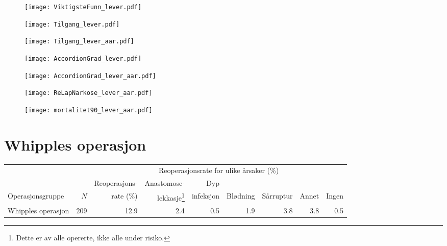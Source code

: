 \documentclass[norsk,a4paper]{article}\usepackage[]{graphicx}\usepackage[]{color}
\begin{document}
\begin{figure}[ht]
\centering
\texttt{[image: ViktigsteFunn\_lever.pdf]}
\caption{}
\end{figure}

\begin{figure}[ht]
\centering
\texttt{[image: Tilgang\_lever.pdf]}
\caption{}
\end{figure}

\begin{figure}[ht]
\centering
\texttt{[image: Tilgang\_lever\_aar.pdf]}
\caption{}
\end{figure}

\begin{figure}[ht]
\centering
\texttt{[image: AccordionGrad\_lever.pdf]}
\caption{}
\end{figure}

\begin{figure}[ht]
\centering
\texttt{[image: AccordionGrad\_lever\_aar.pdf]}
\caption{}
\end{figure}

\begin{figure}[ht]
\centering
\texttt{[image: ReLapNarkose\_lever\_aar.pdf]}
\caption{}
\end{figure}


\begin{figure}[ht]
\centering
\texttt{[image: mortalitet90\_lever\_aar.pdf]}
\caption{}
\end{figure}

\clearpage

\section{Whipples operasjon}

\begin{table}[htb]
\begin{minipage}{\textwidth}
\centering
\begin{tabular}{lrrrrrrrr}
  \toprule
  & & & \multicolumn{4}{c}{Reoperasjonsrate for ulike årsaker (\%)} \\
 \cline{4-9} 
 & & Reoperasjons- & Anastomose- & Dyp &&&&  \\
 Operasjonsgruppe & $N$ & rate (\%) & lekkasje\footnote[2]{Dette er av alle opererte, ikke
alle under risiko.} & infeksjon & Blødning & Sårruptur & Annet & Ingen \\
 \midrule
Whipples operasjon & 209 & 12.9 & 2.4 & 0.5 & 1.9 & 3.8 & 3.8 & 0.5 \\ 
   \bottomrule
\end{tabular}

\end{minipage}
\end{table}
\end{document}
